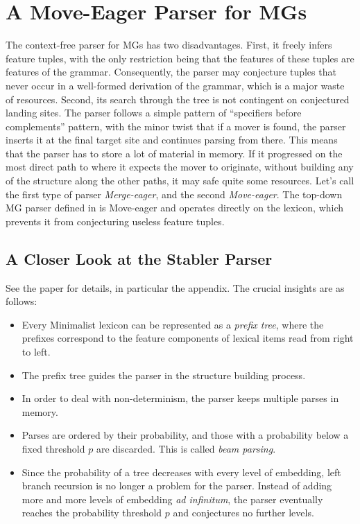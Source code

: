 \chapter{A Move-Eager Parser for MGs}
\label{cha:StablerParser}

The context-free parser for MGs has two disadvantages.
First, it freely infers feature tuples, with the only restriction being that the features of these tuples are features of the grammar.
Consequently, the parser may conjecture tuples that never occur in a well-formed derivation of the grammar, which is a major waste of resources.
Second, its search through the tree is not contingent on conjectured landing sites.
The parser follows a simple pattern of ``specifiers before complements'' pattern, with the minor twist that if a mover is found, the parser inserts it at the final target site and continues parsing from there.
This means that the parser has to store a lot of material in memory.
If it progressed on the most direct path to where it expects the mover to originate, without building any of the structure along the other paths, it may safe quite some resources.
Let's call the first type of parser \emph{Merge-eager}, and the second \emph{Move-eager}.
The top-down MG parser defined in \citet{Stabler12} is Move-eager and operates directly on the lexicon, which prevents it from conjecturing useless feature tuples.

\section{A Closer Look at the Stabler Parser}
See the paper for details, in particular the appendix.
The crucial insights are as follows:
%
\begin{itemize}
    \item Every Minimalist lexicon can be represented as a \emph{prefix tree}, where the prefixes correspond to the feature components of lexical items read from right to left.
    \item The prefix tree guides the parser in the structure building process.
    \item In order to deal with non-determinism, the parser keeps multiple parses in memory.
    \item Parses are ordered by their probability, and those with a probability below a fixed threshold $p$ are discarded.
        This is called \emph{beam parsing}.
    \item Since the probability of a tree decreases with every level of embedding, left branch recursion is no longer a problem for the parser.
        Instead of adding more and more levels of embedding \emph{ad infinitum}, the parser eventually reaches the probability threshold $p$ and conjectures no further levels.
\end{itemize}

